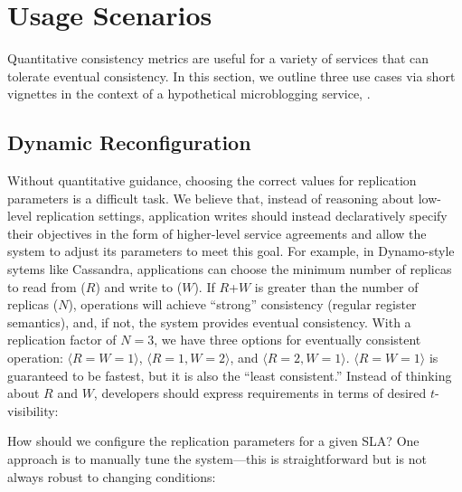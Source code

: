 \section{Usage Scenarios}
\label{sec:scenarios}

Quantitative consistency metrics are useful for a variety of services
that can tolerate eventual consistency. In this section, we outline
three use cases via short vignettes in the context of a hypothetical
microblogging service, {\systemname}.

\subsection{Dynamic Reconfiguration}
\label{sec:dynamic}

Without quantitative guidance, choosing the correct values for
replication parameters is a difficult task. We believe that, instead
of reasoning about low-level replication settings, application writes
should instead declaratively specify their objectives in the form of
higher-level service agreements and allow the system to adjust its
parameters to meet this goal. For example, in Dynamo-style sytems like
Cassandra, applications can choose the minimum number of replicas to
read from ($R$) and write to ($W$). If $R$+$W$ is greater than the
number of replicas ($N$), operations will achieve ``strong''
consistency (regular register semantics), and, if not, the system
provides eventual consistency. With a replication factor of $N=3$, we
have three options for eventually consistent operation: $\langle
R$$=$$W$$=$$1\rangle$, $\langle R$$=$$1$$, W$$=$$2\rangle$, and
$\langle R$$=$$2$$, W$$=$$1\rangle$.  $\langle R$$=$$W$$=$$1\rangle$
is guaranteed to be fastest, but it is also the ``least consistent.''
Instead of thinking about $R$ and $W$, developers should express
requirements in terms of desired $t$-visibility:


How should we configure the replication parameters for a given SLA?
One approach is to manually tune the system---this is straightforward
but is not %
always robust to changing conditions:


